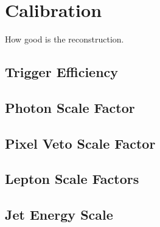 \chapter{Calibration}

How good is the reconstruction.

\section{Trigger Efficiency}

\section{Photon Scale Factor}

\section{Pixel Veto Scale Factor}

\section{Lepton Scale Factors}

\section{Jet Energy Scale}
